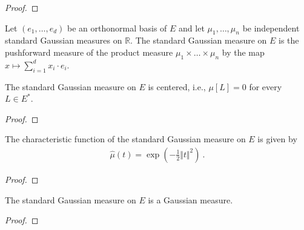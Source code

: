 \begin{proof}

\end{proof}


\begin{definition}\label{def:stdGaussian}
Let $(e_1, \ldots, e_d)$ be an orthonormal basis of $E$ and let $\mu_1, \ldots, \mu_n$ be independent standard Gaussian measures on $\mathbb{R}$.
The standard Gaussian measure on $E$ is the pushforward measure of the product measure $\mu_1 \times \ldots \times \mu_n$ by the map $x \mapsto \sum_{i=1}^d x_i \cdot e_i$.
\end{definition}


\begin{lemma}\label{lem:isCentered_stdGaussian}
The standard Gaussian measure on $E$ is centered, i.e., $\mu[L] = 0$ for every $L \in E^*$.
\end{lemma}

\begin{proof}

\end{proof}


\begin{lemma}\label{lem:charFun_stdGaussian}
The characteristic function of the standard Gaussian measure on $E$ is given by
\begin{align*}
  \hat{\mu}(t) = \exp\left(-\frac{1}{2} \Vert t \Vert^2 \right) \: .
\end{align*}
\end{lemma}

\begin{proof}

\end{proof}


\begin{lemma}\label{lem:isGaussian_stdGaussian}
The standard Gaussian measure on $E$ is a Gaussian measure.
\end{lemma}

\begin{proof}

\end{proof}


